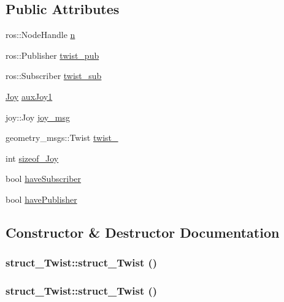 \subsection*{Public Attributes}
\begin{DoxyCompactItemize}
\item 
ros::NodeHandle \hyperlink{classstruct__Twist_a2d3e2346abef34de6bb72a5b783a367e}{n}
\item 
ros::Publisher \hyperlink{classstruct__Twist_aee5b5a8a8f139c8d94c50ea74aa242df}{twist\_\-pub}
\item 
ros::Subscriber \hyperlink{classstruct__Twist_aec635faa1bd8d788f567f7fdfe425dfb}{twist\_\-sub}
\item 
\hyperlink{structJoy}{Joy} \hyperlink{classstruct__Twist_a62e055e979ef7e00e4fa5b28e5af58a3}{auxJoy1}
\item 
joy::Joy \hyperlink{classstruct__Twist_a71712cfdc47912e38edf31527ddabdf0}{joy\_\-msg}
\item 
geometry\_\-msgs::Twist \hyperlink{classstruct__Twist_a9df8e9fe3a53331a21e015a7a68346f1}{twist\_\-}
\item 
int \hyperlink{classstruct__Twist_af6f8a2260faa75ff5e69195ea06dbdc5}{sizeof\_\-Joy}
\item 
bool \hyperlink{classstruct__Twist_af4ebb0d68d02c7e0bc6f4ef01a28f3f9}{haveSubscriber}
\item 
bool \hyperlink{classstruct__Twist_a56123bf7b16afa13ca976101c263f9e1}{havePublisher}
\end{DoxyCompactItemize}


\subsection{Constructor \& Destructor Documentation}
\hypertarget{classstruct__Twist_a164175a79d7c3c66dbd7fdbcea350029}{
\subsubsection[{struct\_\-Twist}]{\setlength{\rightskip}{0pt plus 5cm}struct\_\-Twist::struct\_\-Twist ()}}
\label{classstruct__Twist_a164175a79d7c3c66dbd7fdbcea350029}
\hypertarget{classstruct__Twist_a164175a79d7c3c66dbd7fdbcea350029}{
\subsubsection[{struct\_\-Twist}]{\setlength{\rightskip}{0pt plus 5cm}struct\_\-Twist::struct\_\-Twist ()}}
\label{classstruct__Twist_a164175a79d7c3c66dbd7fdbcea350029}


